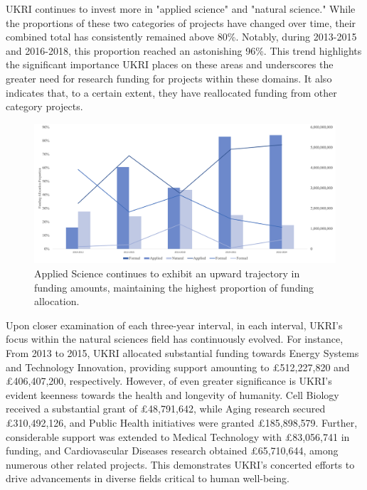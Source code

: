 UKRI continues to invest more in "applied science" and "natural science." While the proportions of these two categories of projects have changed over time, their combined total has consistently remained above 80\%. Notably, during 2013-2015 and 2016-2018, this proportion reached an astonishing 96\%. This trend highlights the significant importance UKRI places on these areas and underscores the greater need for research funding for projects within these domains. It also indicates that, to a certain extent, they have reallocated funding from other category projects.\\

\begin{figure}[H]
\centering
\includegraphics[scale=0.4]{Figures/funding_amount.png}
\caption[Evolution of Funding Trends Across Categories]{Applied Science continues to exhibit an upward trajectory in funding amounts, maintaining the highest proportion of funding allocation.}
\label{figure3.5} 
\end{figure}
Upon closer examination of each three-year interval, in each interval, UKRI's focus within the natural sciences field has continuously evolved. For instance, From 2013 to 2015, UKRI allocated substantial funding towards Energy Systems and Technology Innovation, providing support amounting to £512,227,820 and £406,407,200, respectively. However, of even greater significance is UKRI's evident keenness towards the health and longevity of humanity. Cell Biology received a substantial grant of £48,791,642, while Aging research secured £310,492,126, and Public Health initiatives were granted £185,898,579. Further, considerable support was extended to Medical Technology with £83,056,741 in funding, and Cardiovascular Diseases research obtained £65,710,644, among numerous other related projects. This demonstrates UKRI's concerted efforts to drive advancements in diverse fields critical to human well-being.\\

